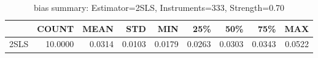 \begin{table}[ht]
\centering
\caption{bias summary: Estimator=2SLS, Instruments=333, Strength=0.70}
\begin{tabular}{lrrrrrrrr}
\toprule
 & COUNT & MEAN & STD & MIN & 25\% & 50\% & 75\% & MAX \\
\midrule
2SLS & 10.0000 & 0.0314 & 0.0103 & 0.0179 & 0.0263 & 0.0303 & 0.0343 & 0.0522 \\
\bottomrule
\end{tabular}
\end{table}
